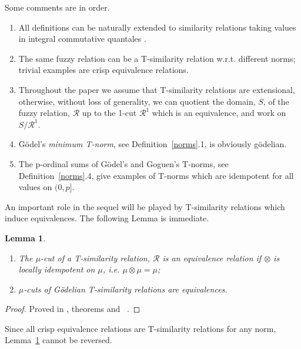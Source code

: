 \documentclass{article}
\def\ie{{\em i.e. }}
\newcommand{\cR}{{\mathcal R}}
\newtheorem{lemma}{Lemma}[section]
\begin{document}
Some comments are in order.
\begin{enumerate}
\item All definitions can be naturally extended to similarity relations taking values in integral commutative quantales \cite{}.
\item The same fuzzy relation can be a T-similarity relation w.r.t. different norms; trivial examples are crisp equivalence relations. 
\item Throughout the paper we assume that T-similarity relations are extensional, otherwise, without loss of generality, we can quotient the domain, $S$, of the fuzzy relation, $\cR$ up to the 1-cut $\cR^1$ which is an equivalence, and work on $S/\cR^1$. 
\item G\"odel's {\em minimum T-norm}, see Definition~\ref{norms}.1, is obviously g\"odelian.
\item The p-ordinal sums of G\"odel's and Goguen's T-norms, see Definition~\ref{norms}.4, give examples of T-norms which are idempotent for all values on $(0,p]$.
\end{enumerate}
An important role in the sequel will be played by T-similarity relations which induce equivalences.
The following Lemma is immediate.
\begin{lemma}\label{T-equivalence}\hfill \begin{enumerate} 
\item The $\mu$-cut of a T-similarity relation, $\cR$ is an equivalence relation if $\otimes$ is locally idempotent on $\mu$, \ie 
$\mu\otimes\mu=\mu$;
\item $\mu$-cuts of G\"odelian T-similarity relations are equivalences.
\end{enumerate}
\end{lemma}
\begin{proof}
\begin{sloppypar}\raggedright
Proved in , theorems
 and ~\cite{OurRocqRepo}.
\end{sloppypar}
\end{proof}

Since all crisp equivalence relations are T-similarity relations for any norm, Lemma~\ref{T-equivalence} cannot be reversed. 
\end{document}
